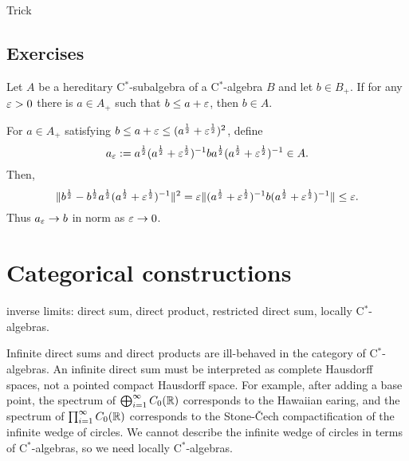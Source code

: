 \documentclass{../../large}
\begin{document}
\begin{prb}
\end{prb}

Trick

\section*{Exercises}
\begin{prb}
Let $A$ be a hereditary C$^*$-subalgebra of a C$^*$-algebra $B$ and let $b\in B_+$.
If for any $\varepsilon>0$ there is $a\in A_+$ such that $b\le a+\varepsilon$, then $b\in A$.
\end{prb}
\begin{pf}
For $a\in A_+$ satisfying $b\le a+\varepsilon\le(a^{\frac12}+\varepsilon^{\frac12})^2$, define
\[a_\varepsilon:=a^{\frac12}(a^{\frac12}+\varepsilon^{\frac12})^{-1}ba^{\frac12}(a^{\frac12}+\varepsilon^{\frac12})^{-1}\in A.\]
Then, 
\[\|b^{\frac12}-b^{\frac12}a^{\frac12}(a^{\frac12}+\varepsilon^{\frac12})^{-1}\|^2=\varepsilon\|(a^{\frac12}+\varepsilon^{\frac12})^{-1}b(a^{\frac12}+\varepsilon^{\frac12})^{-1}\|\le\varepsilon.\]
Thus $a_\varepsilon\to b$ in norm as $\varepsilon\to0$.
\end{pf}












\chapter{Categorical constructions}



inverse limits: direct sum, direct product, restricted direct sum, locally C$^*$-algebras.

Infinite direct sums and direct products are ill-behaved in the category of C$^*$-algebras.
An infinite direct sum must be interpreted as complete Hausdorff spaces, not a pointed compact Hausdorff space.
For example, after adding a base point, the spectrum of $\bigoplus_{i=1}^\infty C_0(\mathbb{R})$ corresponds to the Hawaiian earing, and the spectrum of $\prod_{i=1}^\infty C_0(\mathbb{R})$ corresponds to the Stone-\v Cech compactification of the infinite wedge of circles.
We cannot describe the infinite wedge of circles in terms of C$^*$-algebras, so we need locally C$^*$-algebras.
\end{document}
